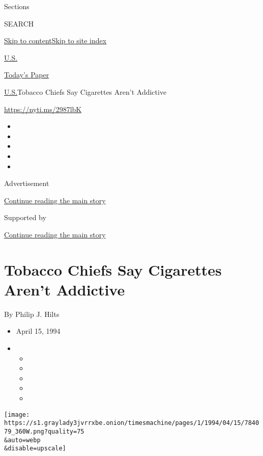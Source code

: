 Sections

SEARCH

\protect\hyperlink{site-content}{Skip to
content}\protect\hyperlink{site-index}{Skip to site index}

\href{https://www.nytimes3xbfgragh.onion/section/us}{U.S.}

\href{https://myaccount.nytimes3xbfgragh.onion/auth/login?response_type=cookie\&client_id=vi}{}

\href{https://www.nytimes3xbfgragh.onion/section/todayspaper}{Today's
Paper}

\href{/section/us}{U.S.}\textbar{}Tobacco Chiefs Say Cigarettes Aren't
Addictive

\url{https://nyti.ms/2987lbK}

\begin{itemize}
\item
\item
\item
\item
\item
\end{itemize}

Advertisement

\protect\hyperlink{after-top}{Continue reading the main story}

Supported by

\protect\hyperlink{after-sponsor}{Continue reading the main story}

\hypertarget{tobacco-chiefs-say-cigarettes-arent-addictive}{%
\section{Tobacco Chiefs Say Cigarettes Aren't
Addictive}\label{tobacco-chiefs-say-cigarettes-arent-addictive}}

By Philip J. Hilts

\begin{itemize}
\item
  April 15, 1994
\item
  \begin{itemize}
  \item
  \item
  \item
  \item
  \item
  \end{itemize}
\end{itemize}

\texttt{[image: https://s1.graylady3jvrrxbe.onion/timesmachine/pages/1/1994/04/15/784079\_360W.png?quality=75\\\&auto=webp\\\&disable=upscale]}

